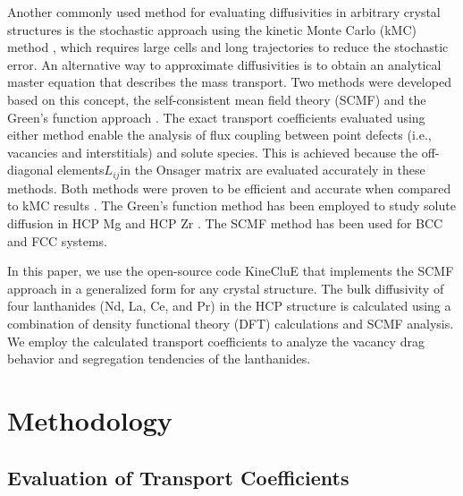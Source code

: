 \documentclass[preprint,12pt]{elsarticle}
\providecommand{\DIFadd}[1]{{\bf #1}} %
\providecommand{\DIFdel}[1]{} %
\providecommand{\DIFaddbegin}{\protect\color{blue}} %
\providecommand{\DIFaddend}{\protect\color{black}} %
\providecommand{\DIFdelbegin}{\protect\color{red}} %
\providecommand{\DIFdelend}{\protect\color{black}} %
\newcommand{\DIFscaledelfig}{0.5}
\newlength{\DIFdelgraphicswidth} %
\newlength{\DIFdelgraphicsheight} %
\newcommand{\DIFaddincludegraphics}[2][]{{\color{blue}\fbox{\DIFOincludegraphics[#1]{#2}}}} %
\newcommand{\DIFdelincludegraphics}[2][]{%
\sbox{\DIFdelgraphicsbox}{\DIFOincludegraphics[#1]{#2}}%
\settoboxwidth{\DIFdelgraphicswidth}{\DIFdelgraphicsbox} %
\settoboxtotalheight{\DIFdelgraphicsheight}{\DIFdelgraphicsbox} %
\scalebox{\DIFscaledelfig}{%
\parbox[b]{\DIFdelgraphicswidth}{\usebox{\DIFdelgraphicsbox}\\[-\baselineskip] \rule{\DIFdelgraphicswidth}{0em}}\llap{\resizebox{\DIFdelgraphicswidth}{\DIFdelgraphicsheight}{%
\setlength{\unitlength}{\DIFdelgraphicswidth}%
\begin{picture}(1,1)%
\thicklines\linethickness{2pt} %
{\color[rgb]{1,0,0}\put(0,0){\framebox(1,1){}}}%
{\color[rgb]{1,0,0}\put(0,0){\line( 1,1){1}}}%
{\color[rgb]{1,0,0}\put(0,1){\line(1,-1){1}}}%
\end{picture}%
}\hspace*{3pt}}} %
} %
\DeclareRobustCommand{\DIFaddbegin}{\DIFOaddbegin \let\includegraphics\DIFaddincludegraphics} %
\DeclareRobustCommand{\DIFaddend}{\DIFOaddend \let\includegraphics\DIFOincludegraphics} %
\DeclareRobustCommand{\DIFdelbegin}{\DIFOdelbegin \let\includegraphics\DIFdelincludegraphics} %
\DeclareRobustCommand{\DIFdelend}{\DIFOaddend \let\includegraphics\DIFOincludegraphics} %
\begin{document}
Another commonly used method for evaluating diffusivities in arbitrary crystal structures is the stochastic approach using the kinetic Monte Carlo (kMC) method \cite{murch_simulation_1984, belova_collective_2000}, which requires large cells and long trajectories to reduce the stochastic error. An alternative way to approximate diffusivities is to obtain an analytical master equation that describes the mass transport. Two methods were developed based on this concept, the self-consistent mean field theory (SCMF) \cite{nastar_self-consistent_2000, nastar_mean_2005} and the Green's function approach \cite{trinkle_automatic_2017}. The exact transport coefficients evaluated using either method enable the analysis of flux coupling between point defects (i.e., vacancies and interstitials) and solute species. This is achieved because the off-diagonal elements\DIFaddbegin \DIFadd{, }\DIFaddend $L_{ij}$\DIFaddbegin \DIFadd{, }\DIFaddend in the Onsager matrix are evaluated accurately in these methods. Both methods were proven to be efficient and accurate when compared to kMC results \cite{jain_first-principles_2019, messina_solute_2020}.
The Green's function method has been employed to study solute diffusion in HCP Mg \cite{agarwal_exact_2017} and HCP Zr \cite{jain_first-principles_2019}. The SCMF method has been used for BCC \cite{messina_exact_2014, messina_solute_2020} and FCC \cite{garnier_quantitative_2014, toijer_solute-point_2021} systems.

In this paper, we use the open-source code KineCluE \cite{schuler_kineclue_2020} that implements the SCMF approach in a generalized form for any crystal structure. The bulk diffusivity of \DIFdelbegin \DIFdel{the }\DIFdelend four lanthanides (Nd, La, Ce, and Pr) in the HCP \DIFdelbegin \DIFdel{zirconium }\DIFdelend \DIFaddbegin \DIFadd{Zr }\DIFaddend structure is calculated using a combination of density functional theory (DFT) calculations and SCMF analysis. We employ the calculated transport coefficients to analyze the vacancy drag behavior and segregation tendencies of the lanthanides.

\section{Methodology}

\subsection{Evaluation of Transport Coefficients}
\end{document}
